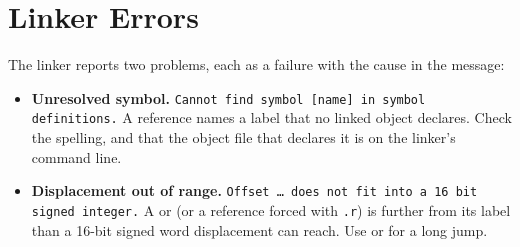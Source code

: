 \section{Linker Errors}

The linker reports two problems, each as a failure with the cause in the message:

\begin{itemize}
	\item \textbf{Unresolved symbol.} \texttt{Cannot find symbol [name] in symbol definitions.} A reference names a label
	      that no linked object declares. Check the spelling, and that the object file that declares it is on the linker's
	      command line.
	\item \textbf{Displacement out of range.} \texttt{Offset \ldots{} does not fit into a 16 bit signed integer.} A
	       or  (or a reference forced with \texttt{.r}) is further from its label than a
	      16-bit signed word displacement can reach. Use  or  for a long jump.
\end{itemize}
